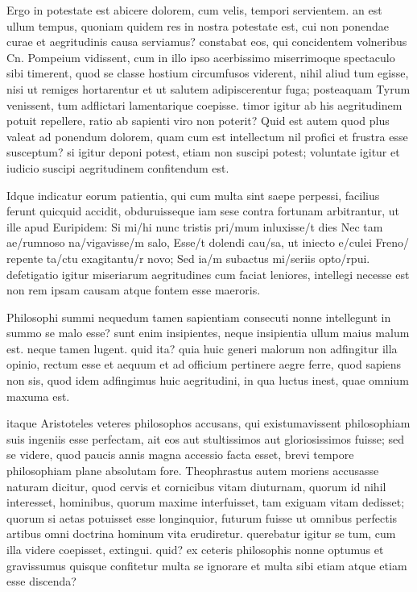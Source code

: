  Ergo in potestate est abicere dolorem, cum velis, tempori servientem. an est ullum tempus, quoniam quidem res in nostra potestate est, cui non ponendae curae et aegritudinis causa serviamus? constabat eos, qui concidentem volneribus Cn. Pompeium vidissent, cum in illo ipso acerbissimo miserrimoque spectaculo sibi timerent, quod se classe hostium circumfusos viderent, nihil aliud tum egisse, nisi ut remiges hortarentur et ut salutem adipiscerentur fuga; posteaquam Tyrum venissent, tum adflictari lamentarique coepisse. timor igitur ab his aegritudinem potuit repellere, ratio ab sapienti viro non poterit? Quid est autem quod plus valeat ad ponendum dolorem, quam cum est intellectum nil profici et frustra esse susceptum? si igitur deponi potest, etiam non suscipi potest; voluntate igitur et iudicio suscipi aegritudinem confitendum est.

 Idque indicatur eorum patientia, qui cum multa sint saepe perpessi, facilius ferunt quicquid accidit, obduruisseque iam sese contra fortunam arbitrantur, ut ille apud Euripidem: Si mi/hi nunc tristis pri/mum inluxisse/t dies Nec tam ae/rumnoso na/vigavisse/m salo, Esse/t dolendi cau/sa, ut iniecto e/culei Freno/ repente ta/ctu exagitantu/r novo; Sed ia/m subactus mi/seriis opto/rpui. defetigatio igitur miseriarum aegritudines cum faciat leniores, intellegi necesse est non rem ipsam causam atque fontem esse maeroris.

 Philosophi summi nequedum tamen sapientiam consecuti nonne intellegunt in summo se malo esse? sunt enim insipientes, neque insipientia ullum maius malum est. neque tamen lugent. quid ita? quia huic generi malorum non adfingitur illa opinio, rectum esse et aequum et ad officium pertinere aegre ferre, quod sapiens non sis, quod idem adfingimus huic aegritudini, in qua luctus inest, quae omnium maxuma est.

 itaque Aristoteles veteres philosophos accusans, qui existumavissent philosophiam suis ingeniis esse perfectam, ait eos aut stultissimos aut gloriosissimos fuisse; sed se videre, quod paucis annis magna accessio facta esset, brevi tempore philosophiam plane absolutam fore. Theophrastus autem moriens accusasse naturam dicitur, quod cervis et cornicibus vitam diuturnam, quorum id nihil interesset, hominibus, quorum maxime interfuisset, tam exiguam vitam dedisset; quorum si aetas potuisset esse longinquior, futurum fuisse ut omnibus perfectis artibus omni doctrina hominum vita erudiretur. querebatur igitur se tum, cum illa videre coepisset, extingui. quid? ex ceteris philosophis nonne optumus et gravissumus quisque confitetur multa se ignorare et multa sibi etiam atque etiam esse discenda?


